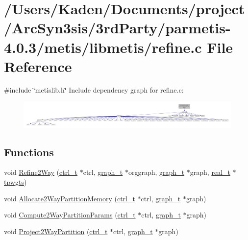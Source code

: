 \hypertarget{a00266}{}\section{/\+Users/\+Kaden/\+Documents/project/\+Arc\+Syn3sis/3rd\+Party/parmetis-\/4.0.3/metis/libmetis/refine.c File Reference}
\label{a00266}
{\ttfamily \#include \char`\"{}metislib.\+h\char`\"{}}\newline
Include dependency graph for refine.\+c\+:\nopagebreak
\begin{figure}[H]
\begin{center}
\leavevmode
\includegraphics[width=350pt]{a00267}
\end{center}
\end{figure}
\subsection*{Functions}
\begin{DoxyCompactItemize}
\item 
void \hyperlink{a00266_ab35c6c9d407568ece9d8398fb2757df8}{Refine2\+Way} (\hyperlink{a00742}{ctrl\+\_\+t} $\ast$ctrl, \hyperlink{a00734}{graph\+\_\+t} $\ast$orggraph, \hyperlink{a00734}{graph\+\_\+t} $\ast$graph, \hyperlink{a00876_a1924a4f6907cc3833213aba1f07fcbe9}{real\+\_\+t} $\ast$\hyperlink{a00879_aa91786cd8ea996ec49ed5b382eb7fc2f}{tpwgts})
\item 
void \hyperlink{a00266_aadcb666600c1f5ded03cdd998b6ffd8f}{Allocate2\+Way\+Partition\+Memory} (\hyperlink{a00742}{ctrl\+\_\+t} $\ast$ctrl, \hyperlink{a00734}{graph\+\_\+t} $\ast$graph)
\item 
void \hyperlink{a00266_a0ed9efb4761e829a24f4066856640f86}{Compute2\+Way\+Partition\+Params} (\hyperlink{a00742}{ctrl\+\_\+t} $\ast$ctrl, \hyperlink{a00734}{graph\+\_\+t} $\ast$graph)
\item 
void \hyperlink{a00266_a99814e73a646480f8af05e7d8bcfe4bc}{Project2\+Way\+Partition} (\hyperlink{a00742}{ctrl\+\_\+t} $\ast$ctrl, \hyperlink{a00734}{graph\+\_\+t} $\ast$graph)
\end{DoxyCompactItemize}



